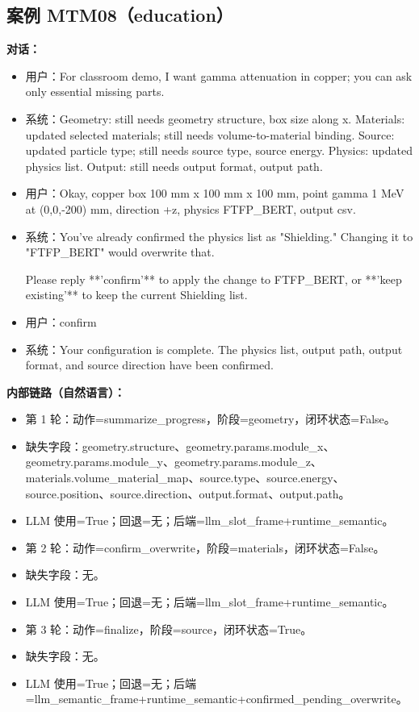 \documentclass[11pt]{ctexart}
\begin{document}
\subsection{案例 MTM08（education）}
\textbf{对话：}
\begin{itemize}
\item 用户：For classroom demo, I want gamma attenuation in copper; you can ask only essential missing parts.
\item 系统：Geometry: still needs geometry structure, box size along x. Materials: updated selected materials; still needs volume-to-material binding. Source: updated particle type; still needs source type, source energy. Physics: updated physics list. Output: still needs output format, output path.
\item 用户：Okay, copper box 100 mm x 100 mm x 100 mm, point gamma 1 MeV at (0,0,-200) mm, direction +z, physics FTFP\_BERT, output csv.
\item 系统：You've already confirmed the physics list as "Shielding." Changing it to "FTFP\_BERT" would overwrite that.

Please reply **'confirm'** to apply the change to FTFP\_BERT, or **'keep existing'** to keep the current Shielding list.
\item 用户：confirm
\item 系统：Your configuration is complete. The physics list, output path, output format, and source direction have been confirmed.
\end{itemize}
\textbf{内部链路（自然语言）：}
\begin{itemize}
\item 第 1 轮：动作=summarize\_progress，阶段=geometry，闭环状态=False。
\item 缺失字段：geometry.structure、geometry.params.module\_x、geometry.params.module\_y、geometry.params.module\_z、materials.volume\_material\_map、source.type、source.energy、source.position、source.direction、output.format、output.path。
\item LLM 使用=True；回退=无；后端=llm\_slot\_frame+runtime\_semantic。
\item 第 2 轮：动作=confirm\_overwrite，阶段=materials，闭环状态=False。
\item 缺失字段：无。
\item LLM 使用=True；回退=无；后端=llm\_slot\_frame+runtime\_semantic。
\item 第 3 轮：动作=finalize，阶段=source，闭环状态=True。
\item 缺失字段：无。
\item LLM 使用=True；回退=无；后端=llm\_semantic\_frame+runtime\_semantic+confirmed\_pending\_overwrite。
\end{itemize}
\end{document}
